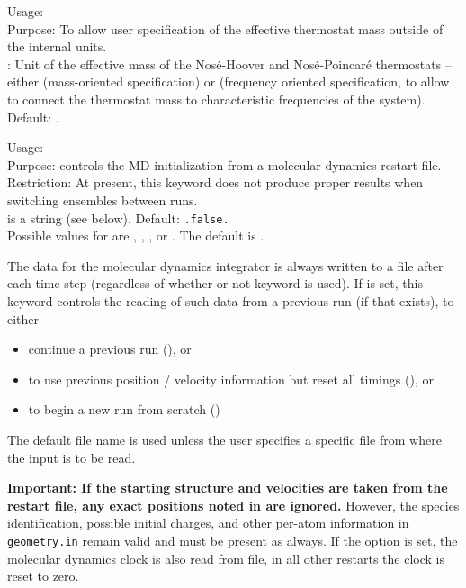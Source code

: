 {\noindent
  Usage:   \\[1.0ex]
  Purpose: To allow user specification of the effective thermostat
  mass outside of the internal units. \\[1.0ex]
   : Unit of the effective mass of the Nos\'e-Hoover and
    Nos\'e-Poincar\'e thermostats --
    either  (mass-oriented specification) or
     (frequency oriented specification, to
    allow to connect the thermostat mass to characteristic frequencies
    of the system). Default:  . \\}

{\noindent
        Usage:   \\[1.0ex]
        Purpose: controls the MD initialization from a molecular
          dynamics restart file. \\[1.0ex]
        Restriction: At present, this keyword does not produce proper results
          when switching ensembles between runs. \\[1.0ex]  
         is a string (see below). Default:
          \texttt{.false.} \\
} 
Possible values for  are , , 
, or . The default is . 

The data for the molecular dynamics integrator is always written to a file  
 after each time step (regardless of whether or
not keyword  is used). 
If  is set, this keyword controls the reading of such
data from a previous run (if that exists), to either 
\begin{itemize}
  \item continue a previous run (), or
  \item to use previous position / velocity information
    but reset all timings (), or
  \item to begin a new run from scratch ()
\end{itemize} 
The default file name is used unless the user specifies a 
specific file  from where the input is to be read. 

\textbf{Important: If the starting structure and velocities are taken from 
the restart file, any exact positions noted in  are
ignored.} However, the species identification, possible initial charges, and
other per-atom information in \texttt{geometry.in} remain valid and must be
present as always. If the option  
is set, the molecular dynamics clock is also read from file, in all 
other restarts the clock is reset to zero. 

